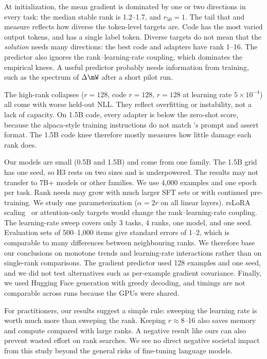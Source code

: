 At initialization, the mean gradient is dominated by one or two directions in every task: the median stable rank is 1.2--1.7, and $r_{50}=1$. The tail that \rninety and \erank measure reflects how diverse the token-level targets are. Code has the most varied output tokens, and \sst has a single label token. Diverse targets do not mean that the \emph{solution} needs many directions: the best code and \gsm adapters have rank 1--16. The predictor also ignores the rank--learning-rate coupling, which dominates the empirical knees. A useful predictor probably needs information from training, such as the spectrum of $\Delta\mW$ after a short pilot run.

The high-rank collapses (\boolq $r{=}128$, code $r{=}128$, \gsm $r{=}128$ at learning rate $5\times10^{-4}$) all come with worse held-out NLL. They reflect overfitting or instability, not a lack of capacity. On 1.5B code, every adapter is below the zero-shot \mbpp score, because the alpaca-style training instructions do not match \mbpp's prompt and assert format. The 1.5B code knee therefore mostly measures how little damage each rank does.

Our models are small (0.5B and 1.5B) and come from one family. The 1.5B grid has one seed, so H3 rests on two sizes and is underpowered. The results may not transfer to 7B+ models or other families. We use 4,000 examples and one epoch per task. Rank needs may grow with much larger SFT sets or with continued pre-training. We study one parameterization ($\alpha=2r$ on all linear layers). rsLoRA scaling~\citep{kalajdzievski2023rslora} or attention-only targets would change the rank--learning-rate coupling. The learning-rate sweep covers only 3 tasks, 4 ranks, one model, and one seed. Evaluation sets of 500--1,000 items give standard errors of 1--2\pp, which is comparable to many differences between neighbouring ranks. We therefore base our conclusions on monotone trends and learning-rate interactions rather than on single-rank comparisons. The gradient predictor used 128 examples and one seed, and we did not test alternatives such as per-example gradient covariance. Finally, we used Hugging Face generation with greedy decoding, and timings are not comparable across runs because the GPUs were shared.

For practitioners, our results suggest a simple rule: sweeping the learning rate is worth much more than sweeping the rank. Keeping $r\approx 8$--16 also saves memory and compute compared with large ranks. A negative result like ours can also prevent wasted effort on rank searches. We see no direct negative societal impact from this study beyond the general risks of fine-tuning language models.
